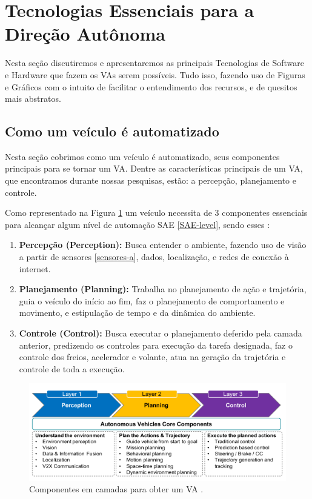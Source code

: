 \section{Tecnologias Essenciais para a Direção Autônoma} \label{essencias_di}

Nesta seção discutiremos e apresentaremos as principais Tecnologias de Software e Hardware que fazem os VAs serem possíveis. Tudo isso, fazendo uso de Figuras e Gráficos com o intuito de facilitar o entendimento dos recursos, e de quesitos mais abstratos. 


\subsection{Como um veículo é automatizado} \label{auto}
Nesta seção cobrimos como um veículo é automatizado, seus componentes principais para se tornar um VA. Dentre as características principais de um VA, que encontramos durante nossas pesquisas, estão: a percepção, planejamento e controle.

Como representado na Figura \ref{figura_perception} um veículo necessita de 3 componentes essenciais para alcançar algum nível de automação SAE \ref{SAE-level}, sendo esses \cite{sensors-yet}:


\begin{enumerate}
 \item \textbf{Percepção (Perception):} Busca entender o ambiente, fazendo uso de visão a partir de sensores \ref{sensores-a}, dados, localização, e redes de conexão à internet.
\item \textbf{Planejamento (Planning):} Trabalha no planejamento de ação e trajetória, guia o veículo do início ao fim, faz o planejamento de comportamento e movimento, e estipulação de tempo e da dinâmica do ambiente.
\item \textbf{Controle (Control):} Busca executar o planejamento deferido pela camada anterior, predizendo os controles para execução da tarefa designada, faz o controle dos freios, acelerador e volante, atua na geração da trajetória e controle de toda a execução.

\end{enumerate}

\begin{figure}[H]
\centering
\includegraphics[width=\textwidth]{Figures/perception.png}
\caption{Componentes em camadas para obter um VA \cite{sensors-yet}.}
\label{figura_perception}
\end{figure}

